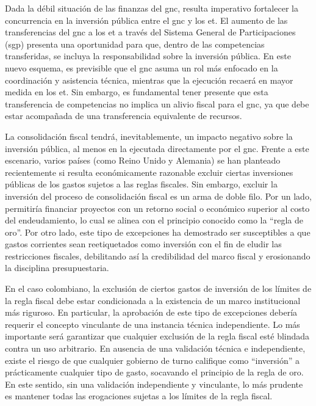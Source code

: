 Dada la débil situación de las finanzas del \gls{gnc}, resulta imperativo fortalecer la concurrencia en la inversión pública entre el \gls{gnc} y los \gls{et}. El aumento de las transferencias del \gls{gnc} a los \gls{et} a través del  Sistema General de Participaciones (\gls{sgp}) presenta una oportunidad para que, dentro de las competencias transferidas, se incluya la responsabilidad sobre la inversión pública. En este nuevo esquema, es previsible que el \gls{gnc} asuma un rol más enfocado en la coordinación y asistencia técnica, mientras que la ejecución recaerá en mayor medida en los \gls{et}. Sin embargo, es fundamental tener presente que esta transferencia de competencias no implica un alivio fiscal para el \gls{gnc}, ya que debe estar acompañada de una transferencia equivalente de recursos. %

La consolidación fiscal tendrá, inevitablemente, un impacto negativo sobre la inversión pública, al menos en la ejecutada directamente por el \gls{gnc}. Frente a este escenario, varios países (como Reino Unido y Alemania) se han planteado recientemente si resulta económicamente razonable excluir ciertas inversiones públicas de los gastos sujetos a las reglas fiscales. Sin embargo, excluir la inversión del proceso de consolidación fiscal es un arma de doble filo. Por un lado, permitiría financiar proyectos con un retorno social o económico superior al costo del endeudamiento, lo cual se alinea con el principio conocido como la ``regla de oro''. Por otro lado, este tipo de excepciones ha demostrado ser susceptibles a que gastos corrientes sean reetiquetados como inversión con el fin de eludir las restricciones fiscales, debilitando así la credibilidad del marco fiscal y erosionando la disciplina presupuestaria.

En el caso colombiano, la exclusión de ciertos gastos de inversión de los límites de la regla fiscal debe estar condicionada a la existencia de un marco institucional más riguroso. En particular, la aprobación de este tipo de excepciones debería requerir el concepto vinculante de una instancia técnica independiente. Lo más importante será garantizar que cualquier exclusión de la regla fiscal esté blindada contra un uso arbitrario. En ausencia de una validación técnica e independiente, existe el riesgo de que cualquier gobierno de turno califique como ``inversión'' a prácticamente cualquier tipo de gasto, socavando el principio de la regla de oro. En este sentido, sin una validación independiente y vinculante, lo más prudente es mantener todas las erogaciones sujetas a los límites de la regla fiscal.

